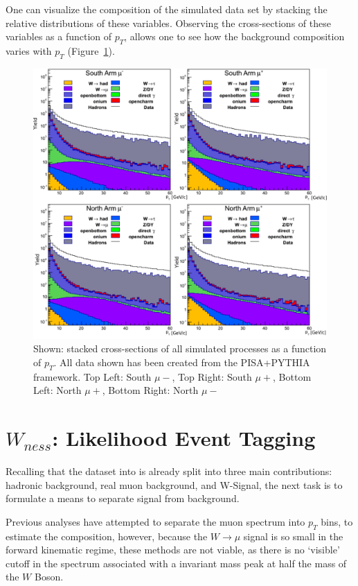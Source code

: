 One can visualize the composition of the simulated data set by stacking the
relative distributions of these variables. Observing the cross-sections of these
variables as a function of $p_T$, allows one to see how the background
composition varies with $p_T$ (Figure~\ref{fig:stacked_xsec_sim}).

\begin{figure}[ht]
  \centering
  \includegraphics[width=\linewidth]{./figures/stacked_xsec.png}
  \caption{
    Shown: stacked cross-sections of all simulated processes as a
    function of $p_T$. All data shown has been created from the PISA+PYTHIA
    framework. Top Left: South $\mu-$, Top Right: South $\mu+$, Bottom Left:
    North $\mu+$, Bottom Right: North $\mu-$~\cite{Seidl2014a}
  }
  \label{fig:stacked_xsec_sim}
\end{figure}

\clearpage


\section{$W_{ness}$: Likelihood Event Tagging}
\label{sec:likelihood}

Recalling that the dataset into is already split into three main contributions:
hadronic background, real muon background, and W-Signal, the next task is to 
formulate a means to separate signal from background.

Previous analyses have attempted to separate the muon spectrum into $p_T$ bins,
to estimate the composition, however, because the $W\rightarrow\mu$ signal is so
small in the forward kinematic regime, these methods are not viable, as
there is no `visible' cutoff in the spectrum associated with a invariant mass
peak at half the mass of the $W$ Boson.

